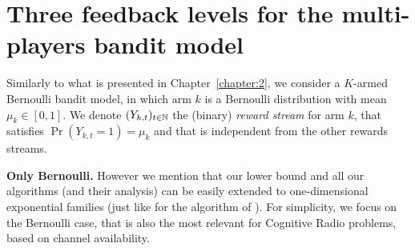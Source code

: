 

\section{Three feedback levels for the multi-players bandit model}
\label{sec:5:model}

Similarly to what is presented in Chapter~\ref{chapter:2},
we consider a $K$-armed Bernoulli bandit model, %
in which arm $k$ is a Bernoulli distribution with mean $\mu_k\in[0,1]$.
We denote $(Y_{k,t})_{t\in\mathbb{N}}$ the \iid{} (binary) \emph{reward stream} for arm $k$, that satisfies $\Pr(Y_{k,t}=1) = \mu_k$ and that is independent from the other rewards streams.

\textbf{Only Bernoulli.}
However we mention that our lower bound and all our algorithms (and their analysis) can be easily extended to one-dimensional exponential families (just like for the \klUCB{} algorithm of \cite{KLUCBJournal}). For simplicity, we focus on the Bernoulli case, that is also the most relevant for Cognitive Radio problems, based on channel availability.





